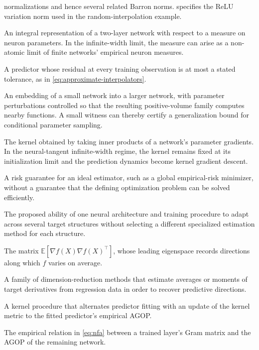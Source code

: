\documentclass[11pt,twoside]{article}
\newcommand{\E}{\mathbb E}
\theoremstyle{definition}
\theoremstyle{remark}
\begin{document}
\begin{description}[style=unboxed,leftmargin=1.5em,labelindent=0pt]
normalizations and hence several related Barron norms.
 specifies the ReLU variation norm used in
the random-interpolation example.
\item[Mean-field representation]
An integral representation of a two-layer network with respect to a measure
on neuron parameters. In the infinite-width limit, the measure can arise as a
non-atomic limit of finite networks' empirical neuron measures.
\item[Approximate interpolator]
A predictor whose residual at every training observation is at most a stated
tolerance, as in \cref{eq:approximate-interpolators}.
\item[Deep lift]
An embedding of a small network into a larger network, with parameter
perturbations controlled so that the resulting positive-volume family
computes nearby functions. A small witness can thereby certify a
generalization bound for conditional parameter sampling.
\item[Neural tangent kernel]
The kernel obtained by taking inner products of a network's parameter
gradients. In the neural-tangent infinite-width regime, the kernel remains
fixed at its initialization limit and the prediction dynamics become kernel
gradient descent.
\item[Oracle statistical result]
A risk guarantee for an ideal estimator, such as a global empirical-risk
minimizer, without a guarantee that the defining optimization problem can be
solved efficiently.
\item[Versatility]
The proposed ability of one neural architecture and training procedure to
adapt across several target structures without selecting a different
specialized estimation method for each structure.
\item[Average gradient outer product]
The matrix $\E[\nabla f(X)\nabla f(X)^\top]$, whose leading eigenspace records
directions along which $f$ varies on average.
\item[Average derivative estimation]
A family of dimension-reduction methods that estimate averages or moments of
target derivatives from regression data in order to recover predictive
directions.
\item[Recursive feature machine]
A kernel procedure that alternates predictor fitting with an update of the
kernel metric to the fitted predictor's empirical AGOP.
\item[Neural feature ansatz]
The empirical relation in \cref{eq:nfa} between a trained layer's Gram matrix
and the AGOP of the remaining network.

\end{description}
\end{document}
